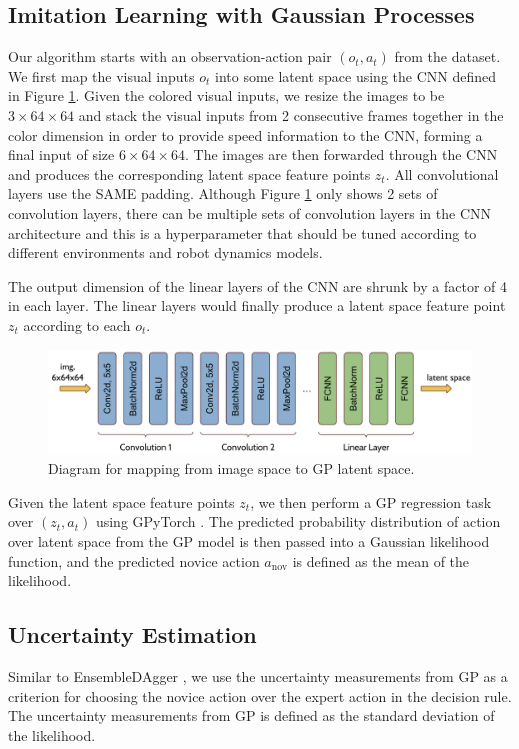 \documentclass[11pt, reqno, letterpaper, twoside]{amsart}
\begin{document}
\subsection{Imitation Learning with Gaussian Processes}
Our algorithm starts with an observation-action pair $(o_t, a_t)$ from the dataset. We first map the visual inputs $o_t$ into some latent space using the CNN defined in Figure \ref{fig:conv_diagram}. Given the colored visual inputs, we resize the images to be $3\times 64\times 64$ and stack the visual inputs from 2 consecutive frames together in the color dimension in order to provide speed information to the CNN, forming a final input of size $6\times 64\times 64$. The images are then forwarded through the CNN and produces the corresponding latent space feature points $z_t$. All convolutional layers use the SAME padding. Although Figure \ref{fig:conv_diagram} only shows 2 sets of convolution layers, there can be multiple sets of convolution layers in the CNN architecture and this is a hyperparameter that should be tuned according to different environments and robot dynamics models.

The output dimension of the linear layers of the CNN are shrunk by a factor of 4 in each layer. The linear layers would finally produce a latent space feature point $z_t$ according to each $o_t$.

\begin{figure}[htbp!]
	\centering
	\includegraphics[width=\linewidth]{imgs/conv_diagram.png}
	\caption{Diagram for mapping from image space to GP latent space.}
	\label{fig:conv_diagram}
\end{figure}

Given the latent space feature points $z_t$, we then perform a GP regression task over $(z_t,a_t)$ using GPyTorch \cite{GPyTorch}. The predicted probability distribution of action over latent space from the GP model is then passed into a Gaussian likelihood function, and the predicted novice action $a_\text{nov}$ is defined as the mean of the likelihood.

\subsection{Uncertainty Estimation}
Similar to EnsembleDAgger \cite{ensemble-dagger}, we use the uncertainty measurements from GP as a criterion for choosing the novice action over the expert action in the decision rule. The uncertainty measurements from GP is defined as the standard deviation of the likelihood.
\end{document}

